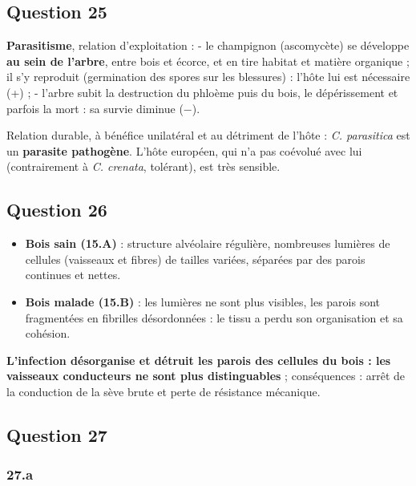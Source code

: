 \documentclass[11pt,a4paper]{article}
\providecommand{\tightlist}{\setlength{\itemsep}{0pt}\setlength{\parskip}{0pt}}
\begin{document}
\hypertarget{question-25}{%
\subsection{Question 25}\label{question-25}}

\textbf{Parasitisme}, relation d'exploitation :
- le champignon (ascomycète) se développe \textbf{au sein de l'arbre}, entre bois et écorce, et en tire habitat et matière organique ; il s'y reproduit (germination des spores sur les blessures) : l'hôte lui est nécessaire (+) ;
- l'arbre subit la destruction du phloème puis du bois, le dépérissement et parfois la mort : sa survie diminue (−).

Relation durable, à bénéfice unilatéral et au détriment de l'hôte : \emph{C. parasitica} est un \textbf{parasite pathogène}. L'hôte européen, qui n'a pas coévolué avec lui (contrairement à \emph{C. crenata}, tolérant), est très sensible.

\hypertarget{question-26}{%
\subsection{Question 26}\label{question-26}}

\begin{itemize}
\tightlist
\item
  \textbf{Bois sain (15.A)} : structure alvéolaire régulière, nombreuses lumières de cellules (vaisseaux et fibres) de tailles variées, séparées par des parois continues et nettes.
\item
  \textbf{Bois malade (15.B)} : les lumières ne sont plus visibles, les parois sont fragmentées en fibrilles désordonnées : le tissu a perdu son organisation et sa cohésion.
\end{itemize}

\textbf{L'infection désorganise et détruit les parois des cellules du bois : les vaisseaux conducteurs ne sont plus distinguables} ; conséquences : arrêt de la conduction de la sève brute et perte de résistance mécanique.

\hypertarget{question-27}{%
\subsection{Question 27}\label{question-27}}

\hypertarget{a}{%
\subsubsection{27.a}\label{a}}
\end{document}
